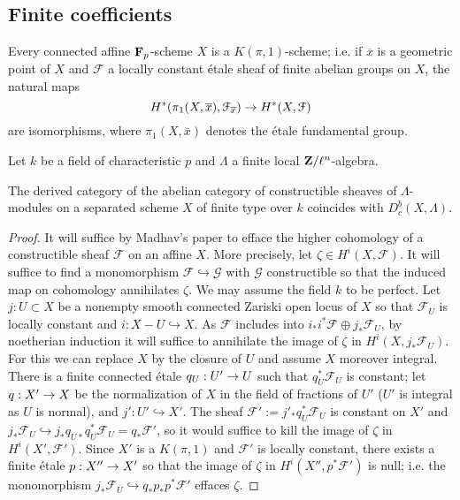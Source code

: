 \documentclass[deligne.tex]{subfiles}
\begin{document}
\subsection{Finite coefficients}
\begin{theorem*}
	Every connected affine $\mathbf{F}_p$-scheme $X$ is a $K(\pi,1)$-scheme; i.e.
	if $\overline x$ is a geometric point of $X$ and $\mathcal F$ a locally
	constant étale sheaf of finite abelian groups on $X$, the natural maps
	\begin{equation*}
	H^*(\pi_1(X,\overline x),\mathcal F_{\overline x})\rightarrow H^*(X,\mathcal F)
	\end{equation*}
	are isomorphisms, where $\pi_1(X,\overline x)$ denotes the étale 
	fundamental group.
\end{theorem*}
Let $k$ be a field of characteristic $p$ and $\Lambda$ a finite local
$\mathbf{Z}/\ell^n$-algebra.
\begin{corollary*}
	The derived category of the abelian category of constructible sheaves of
	$\Lambda$-modules on a separated scheme $X$ of finite type over $k$
	coincides with $D_c^b(X,\Lambda)$.
\end{corollary*}
\begin{proof}
	It will suffice by Madhav's paper to efface the higher cohomology of a 
constructible sheaf $\mathcal F$ on an affine $X$.
More precisely, let $\zeta\in H^i(X,\mathcal F)$.
It will suffice to find a monomorphism $\mathcal F\hookrightarrow\mathcal G$
with $\mathcal G$ constructible so that the induced map on cohomology
annihilates $\zeta$. We may assume the field $k$ to be perfect.
Let $j:U\subset X$ be a nonempty smooth connected Zariski open locus
of $X$ so that $\mathcal F_U$ is locally constant and
$i:X-U\hookrightarrow X$.
As $\mathcal F$ includes into $i_*i^*\mathcal F\oplus j_*\mathcal F_U$, by
noetherian induction it will suffice to annihilate the image of $\zeta$ in
$H^i(X,j_*\mathcal F_U)$. For this we can replace $X$ by the closure of $U$
and assume $X$ moreover integral.
There is a finite connected étale $q_U:U'\rightarrow U$ such that
$q_U^*\mathcal F_U$ is constant; let $q:X'\rightarrow X$ be the normalization of $X$
in the field of fractions of $U'$ ($U'$ is integral as $U$ is normal),
and $j':U'\hookrightarrow X'$.
The sheaf $\mathcal F':=j'_*q_U^*\mathcal F_U$ is constant on $X'$ and
$j_*\mathcal F_U\hookrightarrow j_*q_{U*}q_U^*\mathcal F_U=q_*\mathcal F'$,
so it would  suffice to kill the image of $\zeta$ in $H^i(X',\mathcal F')$.
Since $X'$ is a $K(\pi,1)$ and $\mathcal F'$ is locally constant,
there exists a finite étale $p:X''\rightarrow X'$ so that the image of 
$\zeta$ in $H^i(X'',p^*\mathcal F')$ is null; i.e. the monomorphism
$j_*\mathcal F_U\hookrightarrow q_*p_*p^*\mathcal F'$ effaces $\zeta$.
\end{proof}
\end{document}
